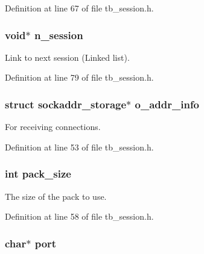 Definition at line 67 of file tb\-\_\-session.\-h.

\hypertarget{structtb__session__t_ae96f976543c2fbc18fd89a368720f4d4}{
\subsubsection[{n\-\_\-session}]{\setlength{\rightskip}{0pt plus 5cm}void$\ast$ n\-\_\-session}}\label{structtb__session__t_ae96f976543c2fbc18fd89a368720f4d4}


Link to next session (Linked list). 



Definition at line 79 of file tb\-\_\-session.\-h.

\hypertarget{structtb__session__t_a723d705438178675e55878826ac4ae7c}{
\subsubsection[{o\-\_\-addr\-\_\-info}]{\setlength{\rightskip}{0pt plus 5cm}struct sockaddr\-\_\-storage$\ast$ o\-\_\-addr\-\_\-info}}\label{structtb__session__t_a723d705438178675e55878826ac4ae7c}


For receiving connections. 



Definition at line 53 of file tb\-\_\-session.\-h.

\hypertarget{structtb__session__t_af7112fe07fe05134febc994e10196ce5}{
\subsubsection[{pack\-\_\-size}]{\setlength{\rightskip}{0pt plus 5cm}int pack\-\_\-size}}\label{structtb__session__t_af7112fe07fe05134febc994e10196ce5}


The size of the pack to use. 



Definition at line 58 of file tb\-\_\-session.\-h.

\hypertarget{structtb__session__t_add99ba4ea70b8f66170823cad9a55fa4}{
\subsubsection[{port}]{\setlength{\rightskip}{0pt plus 5cm}char$\ast$ port}}\label{structtb__session__t_add99ba4ea70b8f66170823cad9a55fa4}


